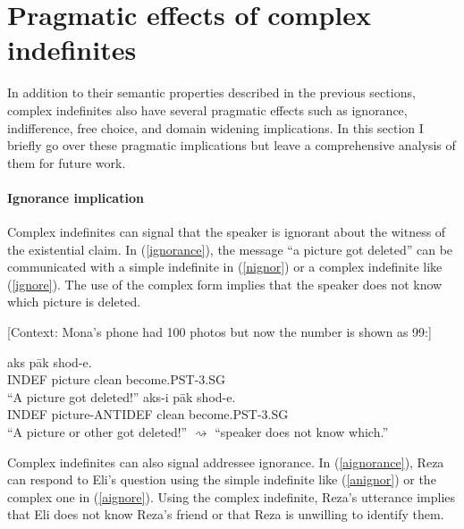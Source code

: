 \documentclass{salt}
\begin{document}

\section {Pragmatic effects of complex indefinites} \label{pragma}

In addition to their semantic properties described in the previous sections, complex indefinites also have several pragmatic effects such as ignorance, indifference, free choice, and domain widening implications. In this section I briefly go over these pragmatic implications but leave a comprehensive analysis of them for future work.

\paragraph {Ignorance implication} Complex indefinites can signal that the speaker is ignorant about the witness of the existential claim. In (\ref{ignorance}), the message ``a picture got deleted'' can be communicated with a simple indefinite in (\ref{nignor}) or a complex indefinite like (\ref{ignore}). The use of the complex form implies that the speaker does not know which picture is deleted.

	\begin {exe}
		\ex \label {ignorance} {\footnotesize [Context: Mona's phone had 100 photos but now the number is shown as 99:]}
		\begin {xlist} \ex \label{nignor}
			 aks p\={a}k shod-e.\\
				{\scriptsize INDEF} picture clean become.{\scriptsize PST}-{\scriptsize 3.SG}\\
			\glt 	``A picture got deleted!''
		\ex \label {ignore}
			 aks-{\color {blue}i} p\={a}k shod-e.\\
				{\scriptsize INDEF} picture-{\scriptsize ANTIDEF} clean become.{\scriptsize PST}-{\scriptsize 3.SG}\\
			\glt 	``A picture or other got deleted!'' {\small $\rightsquigarrow$ ``speaker does not know which.''}
		\end {xlist}
	\end {exe}

Complex indefinites can also signal addressee ignorance. In (\ref{aignorance}), Reza can respond to Eli's question using the simple indefinite like (\ref{anignor}) or the complex one in (\ref{aignore}). Using the complex indefinite, Reza's utterance implies that Eli does not know Reza's friend or that Reza is unwilling to identify them.
\end{document}
